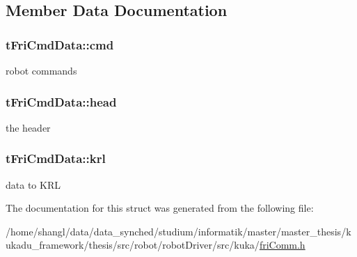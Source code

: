 \subsection{\-Member \-Data \-Documentation}
\hypertarget{structtFriCmdData_a795067adcf52998f477b7aabd5b09906}{
\subsubsection[{cmd}]{ {\bf t\-Fri\-Cmd\-Data\-::cmd}}}\label{structtFriCmdData_a795067adcf52998f477b7aabd5b09906}
robot commands \hypertarget{structtFriCmdData_a4b495c82351202f5fbfaa3b4ea107731}{
\subsubsection[{head}]{ {\bf t\-Fri\-Cmd\-Data\-::head}}}\label{structtFriCmdData_a4b495c82351202f5fbfaa3b4ea107731}
the header \hypertarget{structtFriCmdData_a872ea51ba042c1afd29f325176108505}{
\subsubsection[{krl}]{ {\bf t\-Fri\-Cmd\-Data\-::krl}}}\label{structtFriCmdData_a872ea51ba042c1afd29f325176108505}
data to \-K\-R\-L 

\-The documentation for this struct was generated from the following file\-:\begin{DoxyCompactItemize}
\item 
/home/shangl/data/data\-\_\-synched/studium/informatik/master/master\-\_\-thesis/kukadu\-\_\-framework/thesis/src/robot/robot\-Driver/src/kuka/\hyperlink{friComm_8h}{fri\-Comm.\-h}\end{DoxyCompactItemize}
